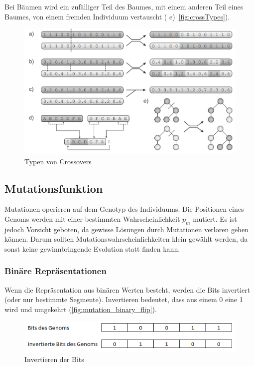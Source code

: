         Bei Bäumen wird ein zufälliger Teil des Baumes, mit einem anderen Teil eines Baumes, von einem fremden Individuum vertauscht ( e)~\vref{fig:crossTypes}).

        \begin{figure}[H]
          \includegraphics[scale=0.7, center]{graphics/crossover_types}
          \caption{Typen von Crossovers~\cite[S.27]{book:bioInspired}\label{fig:crossTypes}}
        \end{figure}


    \subsection{Mutationsfunktion}

      Mutationen operieren auf dem Genotyp des Individuums.
      Die Positionen eines Genoms werden mit einer bestimmten Wahrscheinlichkeit \(p_{m}\) mutiert.
      Es ist jedoch Vorsicht geboten, da gewisse Lösungen durch Mutationen verloren gehen können.
      Darum sollten Mutationswahrscheinlichkeiten klein gewählt werden, da sonst keine gewinnbringende Evolution statt finden kann.

      \subsubsection{Binäre Repräsentationen}

        Wenn die Repräsentation aus binären Werten besteht, werden die Bits invertiert (oder nur bestimmte Segmente).
        Invertieren bedeutet, dass aus einem 0 eine 1 wird und umgekehrt (\vref{fig:mutation_binary_flip}).

        \begin{figure}[H]
          \includegraphics[scale=1, center]{graphics/mutation_binary_flip}
          \caption{Invertieren der Bits\label{fig:mutation_binary_flip}}
        \end{figure}

